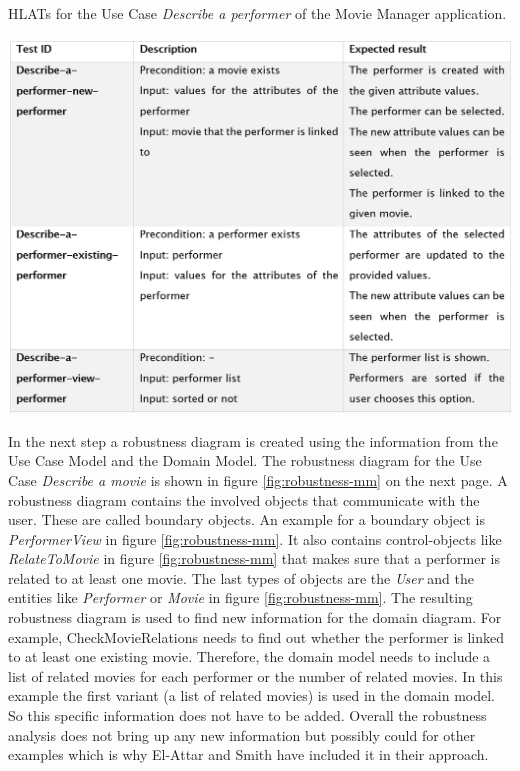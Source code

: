 \begin{table}[H]
	\caption{HLATs for the Use Case \textit{Describe a performer} of the Movie Manager application.}	
	\centering
	\includegraphics[width=.9\textwidth]{../images/ElAttarHLATs.png}

	
	\label{fig:hlats-mm}
\end{table}

In the next step a robustness diagram is created using the information from the Use Case Model and the Domain Model.
The robustness diagram for the Use Case \textit{Describe a movie} is shown in figure \ref{fig:robustness-mm} on the next page.
A robustness diagram contains the involved objects that communicate with the user.
These are called boundary objects.
An example for a boundary object is \textit{PerformerView} in figure \ref{fig:robustness-mm}.
It also contains control-objects like \textit{RelateToMovie} in figure \ref{fig:robustness-mm} that makes sure that a performer is related to at least one movie.
The last types of objects are the \textit{User} and the entities like \textit{Performer} or \textit{Movie} in figure \ref{fig:robustness-mm}.
The resulting robustness diagram is used to find new information for the domain diagram.
For example, CheckMovieRelations needs to find out whether the performer is linked to at least one existing movie.
Therefore, the domain model needs to include a list of related movies for each performer or the number of related movies.
In this example the first variant (a list of related movies) is used in the domain model.
So this specific information does not have to be added.
Overall the robustness analysis does not bring up any new information but possibly could for other examples which is why El-Attar and Smith have included it in their approach.


